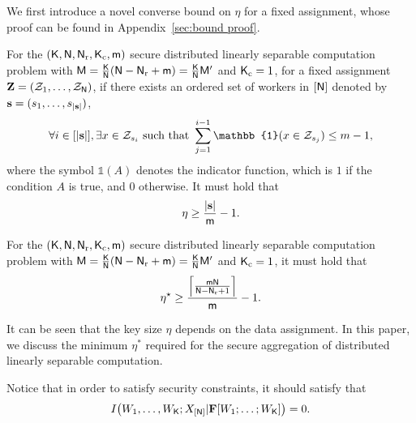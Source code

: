 \documentclass[conference,letterpaper]{IEEEtran}
\begin{document}
We first introduce a novel converse bound on $ \eta $ for a fixed assignment, whose proof can be found in Appendix~\ref{sec:bound proof}.
\begin{thm}
\label{thm:bound of η}
For the $({\sf K},{\sf N},{\sf N}_{\rm r},{\sf K}_{\rm c}, {\sf m})$ secure distributed linearly separable computation problem with  ${\sf M}= \frac{{\sf K}}{{\sf N}} ({\sf N} - {\sf N}_{\rm r} + {\sf m})=\frac{{\sf K}}{{\sf N}} {\sf M}^{\prime}$ and ${\sf K}_{\rm c}=1$, for a fixed assignment $\mathbf{Z}=({\cal Z}_1,\ldots,{\cal Z}_{{\sf N}})$, if there  exists an ordered set of workers in $[{\sf N}]$ denoted by ${\bf s} =(s_1,\ldots,s_{|{\bf s}| })$, 
\begin{align}
\forall i \in [|\sv|], \exists x \in \Zc_{s_i} \text{ such that } \sum_{j=1}^{i-1} \mathbb{1}(x \in \Zc_{s_j}) \le m-1, \label{eq:vector constraint}
\end{align}
where the symbol \(\mathbb{1}(A)\) denotes the indicator function, which is \(1\) if the condition \(A\) is true, and \(0\) otherwise.
It must hold that
\begin{align}
\eta \geq \frac{|{\bf s}|}{{\sf m}}-1. \label{eq:converse lemma}
\end{align}
\end{thm}
 \begin{cor}
\label{cor:converse cor}
For the $({\sf K},{\sf N},{\sf N}_{\rm r},{\sf K}_{\rm c}, {\sf m})$ secure distributed linearly separable computation problem with  ${\sf M}= \frac{{\sf K}}{{\sf N}} ({\sf N} - {\sf N}_{\rm r} + {\sf m})=\frac{{\sf K}}{{\sf N}} {\sf M}^{\prime}$ and ${\sf K}_{\rm c}=1$,
 it must hold that
\begin{align}
\eta^{\star} \geq \frac{\left\lceil  \frac{{\sf m}{\sf N}}{{\sf N}-{\sf N}_{\rm r}+1} \right\rceil}{{\sf m}} -1. \label{eq:converse cor}
\end{align}
\end{cor} 
It can be seen that the key size $ \eta $ depends on the data assignment.
In this paper, we discuss %
  the minimum $\eta^{*}$ required for the secure aggregation of distributed linearly separable computation.

Notice that in order to satisfy security constraints, it should satisfy that
 \begin{align}
I\big(W_{1},\ldots, W_{{\sf K}};   X_{[{\sf N}]} | {\bf F}   [W_1;\ldots;W_{{\sf K}}]  \big)=0. 
\end{align}
\end{document}
